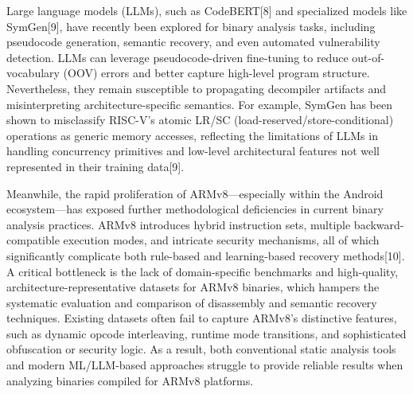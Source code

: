 \documentclass[acmsmall,screen,review,anonymous]{acmart} %
\begin{document}
Large language models (LLMs), such as CodeBERT[8] and specialized models like SymGen[9], have recently been explored for binary analysis tasks, including pseudocode generation, semantic recovery, and even automated vulnerability detection. LLMs can leverage pseudocode-driven fine-tuning to reduce out-of-vocabulary (OOV) errors and better capture high-level program structure. Nevertheless, they remain susceptible to propagating decompiler artifacts and misinterpreting architecture-specific semantics. For example, SymGen has been shown to misclassify RISC-V’s atomic LR/SC (load-reserved/store-conditional) operations as generic memory accesses, reflecting the limitations of LLMs in handling concurrency primitives and low-level architectural features not well represented in their training data[9].

Meanwhile, the rapid proliferation of ARMv8—especially within the Android ecosystem—has exposed further methodological deficiencies in current binary analysis practices. ARMv8 introduces hybrid instruction sets, multiple backward-compatible execution modes, and intricate security mechanisms, all of which significantly complicate both rule-based and learning-based recovery methods[10]. A critical bottleneck is the lack of domain-specific benchmarks and high-quality, architecture-representative datasets for ARMv8 binaries, which hampers the systematic evaluation and comparison of disassembly and semantic recovery techniques. Existing datasets often fail to capture ARMv8’s distinctive features, such as dynamic opcode interleaving, runtime mode transitions, and sophisticated obfuscation or security logic. As a result, both conventional static analysis tools and modern ML/LLM-based approaches struggle to provide reliable results when analyzing binaries compiled for ARMv8 platforms.
\end{document}
